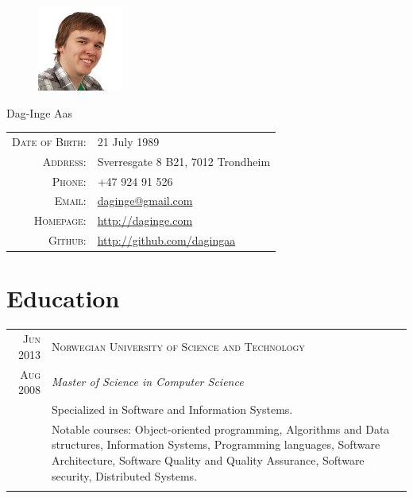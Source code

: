 \documentclass[a4paper,10pt]{article}
\begin{document}
\pagestyle{empty}
  \begin{figure}
  \includegraphics[width=0.25\textwidth]{gurutjenesten.jpg}
  \end{figure}
\par{
  {\Huge Dag-Inge Aas }
  \bigskip\par}

  \begin{tabular}{rl}
  \textsc{Date of Birth:} & 21 July 1989\\
    \textsc{Address:}& Sverresgate 8 B21, 7012 Trondheim\\
    \textsc{Phone:}& +47 924 91 526\\
    \textsc{Email:}& \href{mailto:daginge@gmail.com}{daginge@gmail.com}\\
    \textsc{Homepage:}& \href{http://daginge.com}{http://daginge.com}\\
    \textsc{Github:}& \href{http://github.com/dagingaa}{http://github.com/dagingaa}\\
\end{tabular}

\section{Education}
\begin{tabular}{r|p{12cm}}
  \textsc{Jun 2013} & \textsc{Norwegian University of Science and Technology} \\\textsc{Aug 2008}&\emph{Master of Science in Computer Science}\\&\footnotesize{Specialized in Software and Information Systems.} \\& \footnotesize{Notable courses: Object-oriented programming, Algorithms and Data structures, Information Systems, Programming languages, Software Architecture, Software Quality and Quality Assurance, Software security, Distributed Systems.}\\\multicolumn{2}{c}{} \\
\end{tabular}
\end{document}
